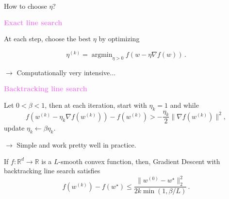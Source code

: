 \documentclass[9pt]{beamer}
\DeclareMathOperator*{\argmin}{argmin}%
\newcommand\citem[1]{{\scriptsize[\citetitle{#1}, \cite{#1}]}}
\newcommand\R{\mathds{R}}
\begin{document}
\begin{frame}{How to choose $\eta$?}
	
	
\textbf{\textcolor{violet}{Exact line search}}
	
At each step, choose the best $\eta$ by optimizing
	
$$
\eta^{(k)} = \argmin_{\eta >0} f(w - \eta \nabla f(w))\,.
$$
			
\smallskip 

$\rightarrow$ \alert{Computationally very intensive...}
	
\bigskip
	
\textbf{\textcolor{violet}{ Backtracking line search}}

Let $0 < \beta < 1$, then at each iteration, start with $\eta_k = 1$ and while
$$
f( w^{(k)} - \eta_k \nabla f (w^{(k)})) - f(w^{(k)}) >  - \frac{\eta_k}{2} \|\nabla f(w^{(k)}) \|^2,
$$
update $ \eta_k \gets \beta \eta_k$.
	
\smallskip

$\rightarrow$ \alert{Simple and work pretty well in practice.}

If $f : \R^d \to \R$ is a \alert{$L$-smooth convex function}, then, Gradient Descent with backtracking line search satisfies
$$
f(w^{(k)}) - f(w^{\star}) \leq \frac{\|w^{(0)} - w^{\star}\|_2^2}{2 k \min(1, \beta/L) }\,.
$$
\end{frame}
\end{document}
